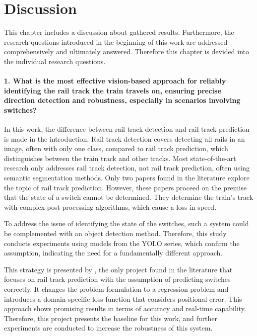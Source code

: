 \chapter{Discussion}
\label{sec:discussion}

This chapter includes a discussion about gathered results.
Furthermore, the research questions introduced in the beginning of this work are addressed comprehensively and ultimately answered.
Therefore this chapter is devided into the individual research questions.

\subsubsection{1. What is the most effective vision-based approach for reliably identifying the rail track the train travels on, ensuring precise direction detection and robustness, especially in scenarios involving switches?}

In this work, the difference between rail track detection and rail track prediction is made in the introduction.
Rail track detection covers detecting all rails in an image, often with only one class, compared to rail track prediction, which distinguishes between the train track and other tracks.
Most state-of-the-art research only addresses rail track detection, not rail track prediction, often using semantic segmentation methods.
Only two papers found in the literature explore the topic of rail track prediction.
However, these papers proceed on the premise that the state of a switch cannot be determined.
They determine the train's track with complex post-processing algorithms, which cause a loss in speed.

To address the issue of identifying the state of the switches, such a system could be complemented with an object detection method.
Therefore, this study conducts experiments using models from the YOLO series, which confirm the assumption, indicating the need for a fundamentally different approach.

This strategy is presented by \cite{tepNet2024}, the only project found in the literature that focuses on rail track prediction with the assumption of predicting switches correctly.
It changes the problem formulation to a regression problem and introduces a domain-specific loss function that considers positional error.
This approach shows promising results in terms of accuracy and real-time capability.
Therefore, this project presents the baseline for this work, and further experiments are conducted to increase the robustness of this system.


